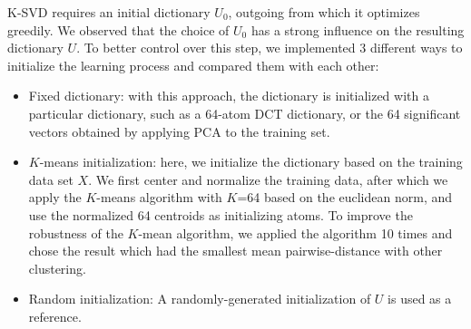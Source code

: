 K-SVD requires an initial dictionary $U_0$, outgoing from which it optimizes greedily. We observed that the choice of $U_0$ has a strong influence on the resulting dictionary $U$. To better control over this step, we implemented 3 different ways to initialize the learning process and compared them with each other:
\begin{itemize}
   \item Fixed dictionary: with this approach, the dictionary is initialized with a particular dictionary, such as a 64-atom DCT dictionary, or the 64 significant vectors obtained by applying PCA to the training set.  
   \item $K$-means initialization: here, we initialize the dictionary based on the training data set $X$. We first center and normalize the training data, after which we apply the $K$-means algorithm with $K$=64 based on the euclidean norm, and use the normalized 64 centroids as initializing atoms. To improve the robustness of the $K$-mean algorithm, we applied the algorithm 10 times and chose the result which had the smallest mean pairwise-distance with other clustering. 
   \item Random initialization: A randomly-generated initialization of $U$ is used as a reference. 
\end{itemize}

